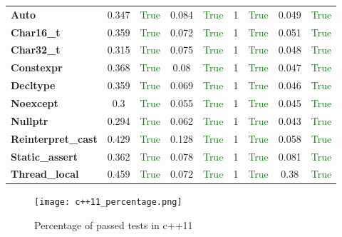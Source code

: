 \documentclass{article}
\begin{document}
\begin{xltabular}{\textwidth}{lcccccccc}
\textbf{{\fontsize{10}{12}\selectfont Auto}}& 0.347&\textcolor{green}{True}& 0.084&\textcolor{green}{True}& 1&\textcolor{green}{True}& 0.049&\textcolor{green}{True} \\[0.5ex]
\textbf{{\fontsize{10}{12}\selectfont Char16\_t}}& 0.359&\textcolor{green}{True}& 0.072&\textcolor{green}{True}& 1&\textcolor{green}{True}& 0.051&\textcolor{green}{True} \\[0.5ex]
\textbf{{\fontsize{10}{12}\selectfont Char32\_t}}& 0.315&\textcolor{green}{True}& 0.075&\textcolor{green}{True}& 1&\textcolor{green}{True}& 0.048&\textcolor{green}{True} \\[0.5ex]
\textbf{{\fontsize{10}{12}\selectfont Constexpr}}& 0.368&\textcolor{green}{True}& 0.08&\textcolor{green}{True}& 1&\textcolor{green}{True}& 0.047&\textcolor{green}{True} \\[0.5ex]
\textbf{{\fontsize{10}{12}\selectfont Decltype}}& 0.359&\textcolor{green}{True}& 0.069&\textcolor{green}{True}& 1&\textcolor{green}{True}& 0.046&\textcolor{green}{True} \\[0.5ex]
\textbf{{\fontsize{10}{12}\selectfont Noexcept}}& 0.3&\textcolor{green}{True}& 0.055&\textcolor{green}{True}& 1&\textcolor{green}{True}& 0.045&\textcolor{green}{True} \\[0.5ex]
\textbf{{\fontsize{10}{12}\selectfont Nullptr}}& 0.294&\textcolor{green}{True}& 0.062&\textcolor{green}{True}& 1&\textcolor{green}{True}& 0.043&\textcolor{green}{True} \\[0.5ex]
\textbf{{\fontsize{10}{12}\selectfont Reinterpret\_cast}}& 0.429&\textcolor{green}{True}& 0.128&\textcolor{green}{True}& 1&\textcolor{green}{True}& 0.058&\textcolor{green}{True} \\[0.5ex]
\textbf{{\fontsize{10}{12}\selectfont Static\_assert}}& 0.362&\textcolor{green}{True}& 0.078&\textcolor{green}{True}& 1&\textcolor{green}{True}& 0.081&\textcolor{green}{True} \\[0.5ex]
\textbf{{\fontsize{10}{12}\selectfont Thread\_local}}& 0.459&\textcolor{green}{True}& 0.072&\textcolor{green}{True}& 1&\textcolor{green}{True}& 0.38&\textcolor{green}{True} \\[0.5ex]
\bottomrule
\end{xltabular}
\newpage
\begin{figure}[h!]
\centering
\texttt{[image: c++11\_percentage.png]}
\caption{Percentage of passed tests in c++11}
\label{fig:c++11_percentage}
\end{figure}
\newpage
\end{document}
